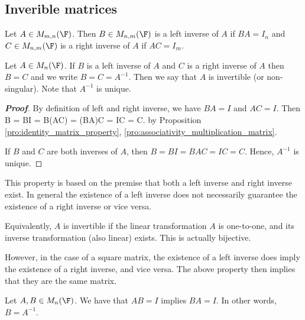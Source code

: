 \subsection{Inverible matrices}

\begin{definition}\label{def:inverse_left}
Let $A\in M_{m,n}(\F)$. Then $B\in M_{n,m}(\F)$ is a left inverse of $A$ if $BA =I_n$ and $C\in M_{n,m}(\F)$ is a right inverse of $A$ if $AC = I_m$.
\end{definition}

\begin{proposition}\label{pro:inverse_matrix}
Let $A\in M_n(\F)$. If $B$ is a left inverse of $A$ and $C$ is a right inverse of $A$ then $B=C$ and we write $B=C = A^{-1}$. Then we say that $A$ is invertible (or non-singular). Note that $A^{-1}$ is unique.
\end{proposition}

\begin{proof}[\bf Proof]
By definition of left and right inverse, we have $BA =I$ and $AC = I$. Then
\be
B = BI = B(AC) = (BA)C = IC = C.
\ee
by Proposition \ref{pro:identity_matrix_property}, \ref{pro:associativity_multiplication_matrix}.

If $B$ and $C$ are both inverses of $A$, then $B = BI = BAC = IC = C$. Hence, $A^{-1}$ is unique.
\end{proof}

\begin{remark}
This property is based on the premise that both a left inverse and right inverse exist. In general the existence of a left inverse does not necessarily guarantee the existence of a right inverse or
vice versa. 

Equivalently, $A$ is invertible if the linear transformation $A$ is one-to-one, and its inverse transformation (also linear) exists. This is actually bijective.
\end{remark}

However, in the case of a square matrix, the existence of a left inverse does imply the existence of a right inverse, and vice versa. The above property then implies that they are the
same matrix.

\begin{proposition}\label{pro:left_or_right_inverse_of_square_matrix_implies_inverse}
Let $A,B\in M_n(\F)$. We have that $AB = I$ implies $BA=I$. In other words, $B = A^{-1}$.
\end{proposition}

